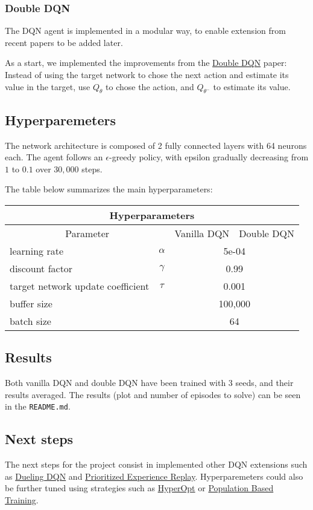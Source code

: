 \documentclass{article}
\begin{document}
\subsubsection{Double DQN}

The DQN agent is implemented in a modular way, to enable extension from recent papers to be added later.

As a start, we implemented the improvements from the \href{https://arxiv.org/abs/1509.06461}{Double DQN} paper:
Instead of using the target network to chose the next action and estimate its value in the target, use $Q_\theta$ to chose the action, and $Q_{\theta^-}$ to estimate its value.

\subsection{Hyperparemeters}

The network architecture is composed of 2 fully connected layers with 64 neurons each.
The agent follows an $\epsilon$-greedy policy, with epsilon gradually decreasing from $1$ to $0.1$ over $30,000$ steps.

The table below summarizes the main hyperparameters:

\begin{tabular}{ |p{5cm} c{1cm}|c{3cm}|c{3cm}| }
 \hline
 \multicolumn{4}{|c|}{Hyperparameters} \\
 \hline
 \multicolumn{2}{|c|}{Parameter} & Vanilla DQN & Double DQN\\
 \hline
 learning rate & $\alpha$ & \multicolumn{2}{|c|}{5e-04}\\
  \hline
 discount factor & $\gamma$ & \multicolumn{2}{|c|}{0.99}\\
  \hline
 target network update coefficient & $\tau$ & \multicolumn{2}{|c|}{0.001}\\
  \hline
  buffer size & & \multicolumn{2}{|c|}{100,000}\\
  \hline
  batch size & & \multicolumn{2}{|c|}{64}\\
 \hline
\end{tabular}

\subsection{Results}

Both vanilla DQN and double DQN have been trained with 3 seeds, and their results averaged.
The results (plot and number of episodes to solve) can be seen in the \texttt{README.md}.


\subsection{Next steps}

The next steps for the project consist in implemented other DQN extensions such as \href{https://arxiv.org/abs/1511.06581}{Dueling DQN} and \href{https://arxiv.org/abs/1511.05952}{Prioritized Experience Replay}. Hyperparemeters could also be further tuned using strategies such as \href{https://github.com/hyperopt/hyperopt}{HyperOpt} or \href{https://deepmind.com/blog/article/population-based-training-neural-networks}{Population Based Training}.
\end{document}
